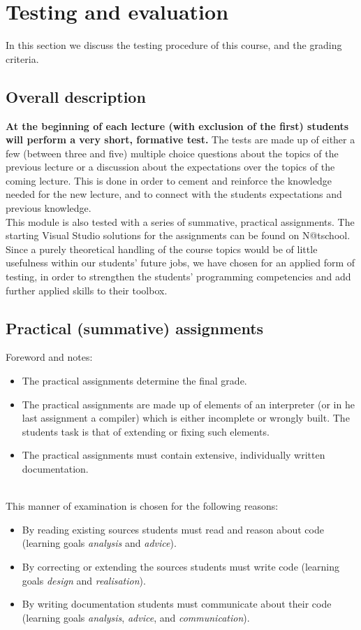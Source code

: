 \documentclass[a4paper, 10pt]{article}
\begin{document}
\newpage
\section{Testing and evaluation}
	In this section we discuss the testing procedure of this course, and the grading criteria.
		
	\subsection{Overall description}
		\textbf{At the beginning of each lecture (with exclusion of the first) students will perform a very short, formative test.} The tests are made up of either a few (between three and five) multiple choice questions about the topics of the previous lecture or a discussion about the expectations over the topics of the coming lecture. This is done in order to cement and reinforce the knowledge needed for the new lecture, and to connect with the students expectations and previous knowledge. \\
		
		This module is also tested with a series of summative, practical assignments. The starting Visual Studio solutions for the assignments can be found on N@tschool. Since a purely theoretical handling of the course topics would be of little usefulness within our students' future jobs, we have chosen for an applied form of testing, in order to strengthen the students' programming competencies and add further applied skills to their toolbox. \\


	\subsection{Practical (summative) assignments}
		Foreword and notes:
		\begin{itemize}
			\item The practical assignments determine the final grade.
			\item The practical assignments are made up of elements of an interpreter (or in he last assignment a compiler) which is either incomplete or wrongly built. The students task is that of extending or fixing such elements.
			\item The practical assignments must contain extensive, individually written documentation.
		\end{itemize}
		\ \\
		
		This manner of examination is chosen for the following reasons:
		\begin{itemize}
			\item By reading existing sources students must read and reason about code (learning goals \textit{analysis} and \textit{advice}).
			\item By correcting or extending the sources students must write code (learning goals \textit{design} and \textit{realisation}).
			\item By writing documentation students must communicate about their code (learning goals \textit{analysis}, \textit{advice}, and \textit{communication}).
		\end{itemize}
\end{document}
